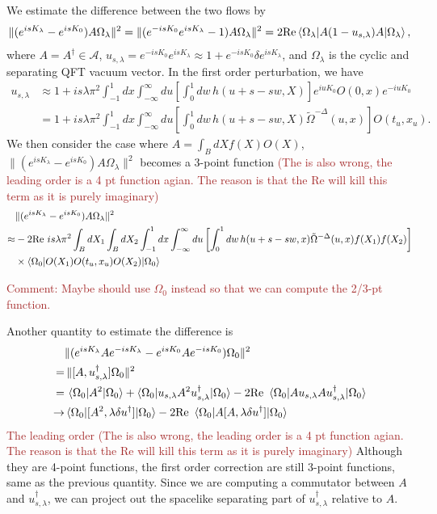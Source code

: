 \documentclass[a4paper,11pt]{article}
\theoremstyle{definition}
\newcommand{\KL}[1]{\textcolor{brown}{#1}}
\begin{document}
We estimate the difference between the two flows by
\begin{align}
    \lVert(e^{isK_\lambda} - e^{isK_0}) A\Omega_\lambda \rVert^2 = \lVert(e^{-isK_0}e^{isK_\lambda} - 1) A\Omega_\lambda \rVert^2 = 2 \text{Re}\braket{\Omega_\lambda|A(1-u_{s,\lambda})A|\Omega_\lambda},
\end{align}
where $A=A^\dagger \in \mathcal{A}$, $u_{s,\lambda} = e^{-isK_0}e^{isK_\lambda} \approx 1 + e^{-isK_0}\delta e^{isK_\lambda}$, and $\Omega_\lambda$ is the cyclic and separating QFT vacuum vector. In the first order perturbation, we have
\begin{align}
    u_{s,\lambda} &\approx 1 + is\lambda\pi^2 \int_{-1}^1 dx \int_{-\infty}^{\infty} du \left[\int_0^1 dw \, h(u+s-sw,X)\right] e^{iuK_0} O(0,x)  e^{-iuK_0}\\
    &=1+ is\lambda\pi^2 \int_{-1}^1 dx \int_{-\infty}^{\infty} du \left[\int_0^1 dw \, h(u+s-sw,X) \tilde{\Omega}^{-\Delta}(u,x) \right] O(t_u,x_u) .
\end{align}
We then consider the case where $A = \int_{B}dX f(X) O(X)$, $\lVert(e^{isK_\lambda} - e^{isK_0}) A\Omega_\lambda \rVert^2$ becomes a 3-point function \KL{(The is also wrong, the leading order is a 4 pt function agian. The reason is that the Re will kill this term as it is purely imaginary)}
\begin{align}
    &\lVert(e^{isK_\lambda} - e^{isK_0}) A\Omega_\lambda \rVert^2\\ 
    \approx&  -2 \text{Re } is\lambda\pi^2 \int_{B}dX_1\int_{B}dX_2\int_{-1}^1 dx \int_{-\infty}^{\infty} du \left[\int_0^1 dw \, h(u+s-sw,x) \tilde{\Omega}^{-\Delta}(u,x) f(X_1)f(X_2) \right] \nonumber\\
    &\times \braket{\Omega_0|O(X_1) O(t_u,x_u) O(X_2)|\Omega_0}
\end{align}

\KL{Comment: Maybe should use $\Omega_0$ instead so that we can compute the 2/3-pt function.}

Another quantity to estimate the difference is
\begin{align}
    &\lVert(e^{isK_\lambda}Ae^{-isK_\lambda} - e^{isK_0} A e^{-isK_0})\Omega_0 \rVert^2 \\
    =&\, \lVert [A, u_{s,\lambda}^\dagger]\Omega_0 \rVert^2 \\
    =&\, \braket{\Omega_0|A^2|\Omega_0} + \braket{\Omega_0|u_{s,\lambda} A^2 u_{s,\lambda}^\dagger|\Omega_0} - 2\text{Re }\braket{\Omega_0|A u_{s,\lambda} A u_{s,\lambda}^\dagger|\Omega_0}\\
    \to &\braket{\Omega_0|[A^2, \lambda\delta u^\dagger]|\Omega_0} - 2\text{Re }\braket{\Omega_0|A[A, \lambda \delta u^\dagger]|\Omega_0}
\end{align}
\KL{The leading order} \KL{(The is also wrong, the leading order is a 4 pt function agian. The reason is that the Re will kill this term as it is purely imaginary)}
Although they are 4-point functions, the first order correction are still 3-point functions, same as the previous quantity. Since we are computing a commutator between $A$ and $u_{s,\lambda}^\dagger$, we can project out the spacelike separating part of $u_{s,\lambda}^\dagger$ relative to $A$. 
\end{document}
